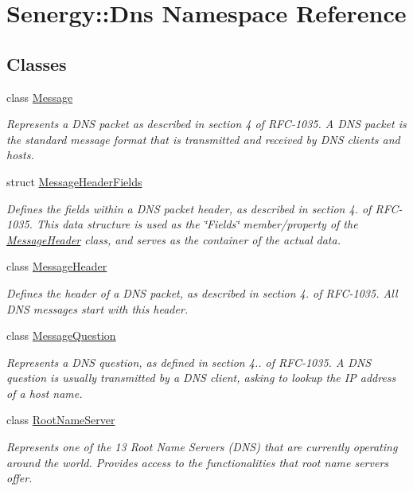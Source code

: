 \hypertarget{namespace_senergy_1_1_dns}{\section{Senergy\-:\-:Dns Namespace Reference}
\label{namespace_senergy_1_1_dns}
}
\subsection*{Classes}
\begin{DoxyCompactItemize}
\item 
class \hyperlink{class_senergy_1_1_dns_1_1_message}{Message}
\begin{DoxyCompactList}\small\item\em Represents a D\-N\-S packet as described in section 4 of R\-F\-C-\/1035. A D\-N\-S packet is the standard message format that is transmitted and received by D\-N\-S clients and hosts. \end{DoxyCompactList}\item 
struct \hyperlink{struct_senergy_1_1_dns_1_1_message_header_fields}{Message\-Header\-Fields}
\begin{DoxyCompactList}\small\item\em Defines the fields within a D\-N\-S packet header, as described in section 4. of R\-F\-C-\/1035. This data structure is used as the \char`\"{}\-Fields\char`\"{} member/property of the \hyperlink{class_senergy_1_1_dns_1_1_message_header}{Message\-Header} class, and serves as the container of the actual data. \end{DoxyCompactList}\item 
class \hyperlink{class_senergy_1_1_dns_1_1_message_header}{Message\-Header}
\begin{DoxyCompactList}\small\item\em Defines the header of a D\-N\-S packet, as described in section 4. of R\-F\-C-\/1035. All D\-N\-S messages start with this header. \end{DoxyCompactList}\item 
class \hyperlink{class_senergy_1_1_dns_1_1_message_question}{Message\-Question}
\begin{DoxyCompactList}\small\item\em Represents a D\-N\-S question, as defined in section 4.. of R\-F\-C-\/1035. A D\-N\-S question is usually transmitted by a D\-N\-S client, asking to lookup the I\-P address of a host name. \end{DoxyCompactList}\item 
class \hyperlink{class_senergy_1_1_dns_1_1_root_name_server}{Root\-Name\-Server}
\begin{DoxyCompactList}\small\item\em Represents one of the 13 Root Name Servers (D\-N\-S) that are currently operating around the world. Provides access to the functionalities that root name servers offer. \end{DoxyCompactList}\end{DoxyCompactItemize}

